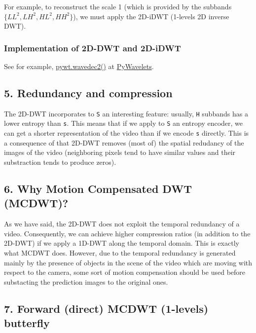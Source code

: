 For example, to reconstruct the scale 1 (which is provided by the
subbands \(\{LL^2, LH^2, HL^2, HH^2\}\)), we must apply the 2D-iDWT
(1-levels 2D inverse DWT).

    \hypertarget{implementation-of-2d-dwt-and-2d-idwt}{%
\subsubsection{Implementation of 2D-DWT and
2D-iDWT}\label{implementation-of-2d-dwt-and-2d-idwt}}

See for example,
\href{https://pywavelets.readthedocs.io/en/latest/ref/2d-dwt-and-idwt.html\#d-multilevel-decomposition-using-wavedec2}{pywt.wavedec2()}
at
\href{https://pywavelets.readthedocs.io/en/latest/index.html}{PyWavelets}.

    \hypertarget{redundancy-and-compression}{%
\subsection{5. Redundancy and
compression}\label{redundancy-and-compression}}

The 2D-DWT incorporates to \texttt{S} an interesting feature: usually,
\texttt{H} subbands has a lower entropy than \texttt{s}. This means that
if we apply to \texttt{S} an entropy encoder, we can get a shorter
representation of the video than if we encode \texttt{s} directly. This
is a consequence of that 2D-DWT removes (most of) the spatial redudancy
of the images of the video (neighboring pixels tend to have similar
values and their substraction tends to produce zeros).

    \hypertarget{why-motion-compensated-dwt-mcdwt}{%
\subsection{6. Why Motion Compensated DWT
(MCDWT)?}\label{why-motion-compensated-dwt-mcdwt}}

As we have said, the 2D-DWT does not exploit the temporal redundancy of
a video. Consequently, we can achieve higher compression ratios (in
addition to the 2D-DWT) if we apply a 1D-DWT along the temporal domain.
This is exactly what MCDWT does. However, due to the temporal redundancy
is generated mainly by the presence of objects in the scene of the video
which are moving with respect to the camera, some sort of motion
compensation should be used before substacting the prediction images to
the original ones.

    \hypertarget{forward-direct-mcdwt-1-levels-butterfly}{%
\subsection{7. Forward (direct) MCDWT (1-levels)
butterfly}\label{forward-direct-mcdwt-1-levels-butterfly}}

